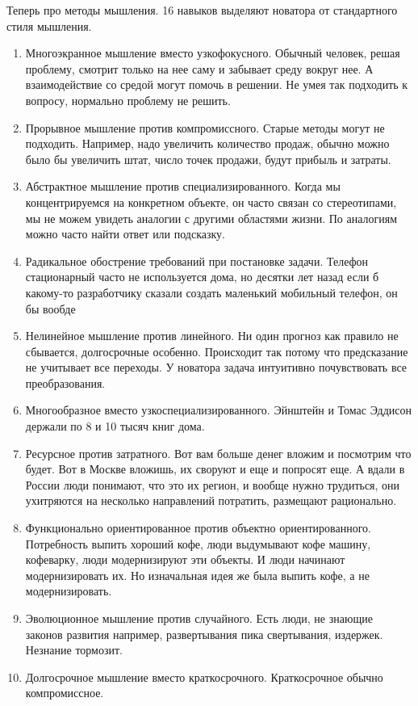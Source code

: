\documentclass[a4paper, 12pt]{article}
\begin{document}
Теперь про методы мышления. 16 навыков выделяют новатора от стандартного стиля мышления. 
\begin{enumerate}
\item Многоэкранное мышление вместо узкофокусного. Обычный человек, решая проблему, смотрит только на нее саму и забывает среду вокруг нее. А взаимодействие со средой могут помочь в решении. Не умея так подходить к вопросу, нормально проблему не решить. 
\item Прорывное мышление против компромиссного. Старые методы могут не подходить. Например, надо увеличить количество продаж, обычно можно было бы увеличить штат, число точек продажи, будут прибыль и затраты. 
\item Абстрактное мышление против специализированного. Когда мы концентрируемся на конкретном объекте, он часто связан со стереотипами, мы не можем увидеть аналогии с другими областями жизни. По аналогиям можно часто найти ответ или подсказку. 
\item Радикальное обострение требований при постановке задачи. Телефон стационарный часто не используется дома, но десятки лет назад если б какому-то разработчику сказали создать маленький мобильный телефон, он бы вообде
\item Нелинейное мышление против линейного. Ни один прогноз как правило не сбывается, долгосрочные особенно. Происходит так потому что предсказание не учитывает все переходы. У новатора задача интуитивно почувствовать все преобразования. 
\item Многообразное вместо узкоспециализированного. Эйнштейн и Томас Эддисон держали по 8 и 10 тысяч книг дома. 
\item Ресурсное против затратного. Вот вам больше денег вложим и посмотрим что будет. Вот в Москве вложишь, их своруют и еще и попросят еще. А вдали в России люди понимают, что это их регион, и вообще нужно трудиться, они ухитряются на несколько направлений потратить, размещают рационально. 
\item Функционально ориентированное против объектно ориентированного. Потребность выпить хороший кофе, люди выдумывают кофе машину, кофеварку, люди модернизируют эти объекты. И люди начинают модернизировать их. Но изначальная идея же была выпить кофе, а не модернизировать. 
\item Эволюционное мышление против случайного. Есть люди, не знающие законов развития например, развертывания пика свертывания, издержек. Незнание тормозит.
\item Долгосрочное мышление вместо краткосрочного. Краткосрочное обычно компромиссное. 

\end{enumerate}
\end{document}
